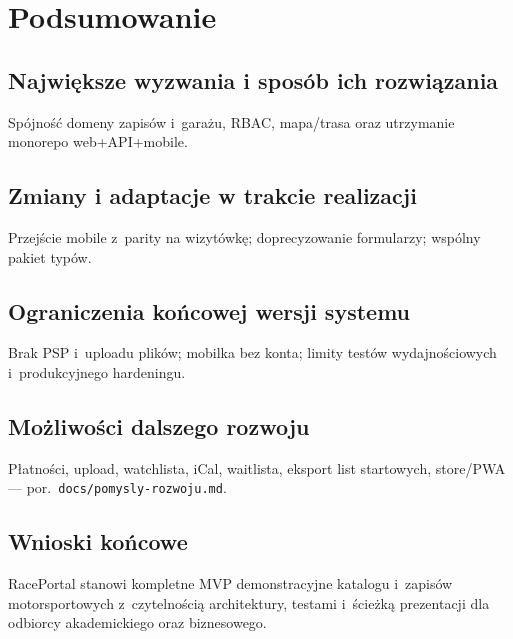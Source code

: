 \documentclass{sprz}
\begin{document}
\chapter{Podsumowanie}
\section{Największe wyzwania i sposób ich rozwiązania}
Spójność domeny zapisów i~garażu, RBAC, mapa/trasa oraz utrzymanie monorepo web+API+mobile.
\section{Zmiany i adaptacje w trakcie realizacji}
Przejście mobile z~parity na wizytówkę; doprecyzowanie formularzy; wspólny pakiet typów.
\section{Ograniczenia końcowej wersji systemu}
Brak PSP i~uploadu plików; mobilka bez konta; limity testów wydajnościowych i~produkcyjnego hardeningu.
\section{Możliwości dalszego rozwoju}
Płatności, upload, watchlista, iCal, waitlista, eksport list startowych, store/PWA --- por.\ \texttt{docs/pomysly-rozwoju.md}.
\section{Wnioski końcowe}
RacePortal stanowi kompletne MVP demonstracyjne katalogu i~zapisów motorsportowych z~czytelnością architektury, testami i~ścieżką prezentacji dla odbiorcy akademickiego oraz biznesowego.

\printbibliography[title={Bibliografia}, heading=bibintoc]

\makethesisattachments
\end{document}
